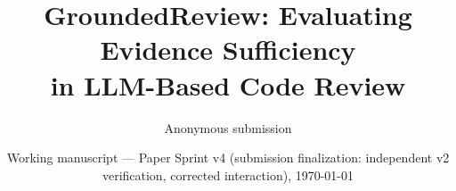 \documentclass[11pt]{article}
\title{\textbf{GroundedReview: Evaluating Evidence Sufficiency \\
in LLM-Based Code Review}}
\author{Anonymous submission}
\date{Working manuscript --- Paper Sprint v4 (submission finalization: independent v2 verification, corrected interaction), \today}
\begin{document}
\maketitle

\begin{abstract}

\end{abstract}
















\appendix

\end{document}
